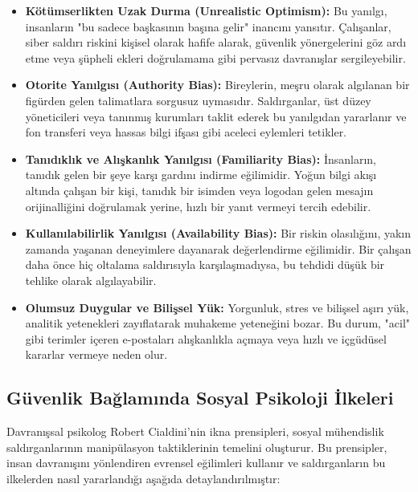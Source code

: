 \begin{itemize}
    \item \textbf{Kötümserlikten Uzak Durma (Unrealistic Optimism):} Bu yanılgı, insanların "bu sadece başkasının başına gelir" inancını yansıtır. Çalışanlar, siber saldırı riskini kişisel olarak hafife alarak, güvenlik yönergelerini göz ardı etme veya şüpheli ekleri doğrulamama gibi pervasız davranışlar sergileyebilir.
    \item \textbf{Otorite Yanılgısı (Authority Bias):} Bireylerin, meşru olarak algılanan bir figürden gelen talimatlara sorgusuz uymasıdır. Saldırganlar, üst düzey yöneticileri veya tanınmış kurumları taklit ederek bu yanılgıdan yararlanır ve fon transferi veya hassas bilgi ifşası gibi aceleci eylemleri tetikler.
    \item \textbf{Tanıdıklık ve Alışkanlık Yanılgısı (Familiarity Bias):} İnsanların, tanıdık gelen bir şeye karşı gardını indirme eğilimidir. Yoğun bilgi akışı altında çalışan bir kişi, tanıdık bir isimden veya logodan gelen mesajın orijinalliğini doğrulamak yerine, hızlı bir yanıt vermeyi tercih edebilir.
    \item \textbf{Kullanılabilirlik Yanılgısı (Availability Bias):} Bir riskin olasılığını, yakın zamanda yaşanan deneyimlere dayanarak değerlendirme eğilimidir. Bir çalışan daha önce hiç oltalama saldırısıyla karşılaşmadıysa, bu tehdidi düşük bir tehlike olarak algılayabilir.
    \item \textbf{Olumsuz Duygular ve Bilişsel Yük:} Yorgunluk, stres ve bilişsel aşırı yük, analitik yetenekleri zayıflatarak muhakeme yeteneğini bozar. Bu durum, "acil" gibi terimler içeren e-postaları alışkanlıkla açmaya veya hızlı ve içgüdüsel kararlar vermeye neden olur.
\end{itemize}

\subsection{Güvenlik Bağlamında Sosyal Psikoloji İlkeleri}

Davranışsal psikolog Robert Cialdini'nin ikna prensipleri, sosyal mühendislik saldırganlarının manipülasyon taktiklerinin temelini oluşturur. Bu prensipler, insan davranışını yönlendiren evrensel eğilimleri kullanır ve saldırganların bu ilkelerden nasıl yararlandığı aşağıda detaylandırılmıştır:

